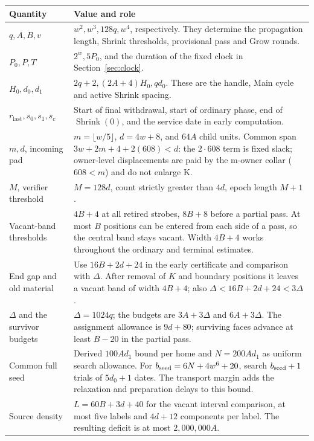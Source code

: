 \begin{longtable}{@{}>{\raggedright\arraybackslash}p{.30\linewidth}>{\raggedright\arraybackslash}p{.62\linewidth}@{}}
\toprule
Quantity & Value and role \\
\midrule
\endhead
\(q,A,B,v\) & \(w^2,w^3,128q,w^4\), respectively. They determine the propagation length, Shrink thresholds, provisional pass and Grow rounds. \\
\(P_0,P,T\) & \(2^w,5P_0\), and the duration of the fixed clock in Section~\ref{sec:clock}. \\
\(H_0,d_0,d_1\) & \(2q+2,(2A+4)H_0,qd_0\). These are the handle, Main cycle and active Shrink spacing. \\
\(r_{\mathrm{last}},s_0,s_1,s_c\) & Start of final withdrawal, start of ordinary phase, end of \(\operatorname{Shrink}(0)\), and the service date in early computation. \\
\(m,d\), incoming pad & \(m=\lfloor w/5\rfloor\), \(d=4w+8\), and \(64A\) child units. Common span \(3w+2m+4+2(608)<d\): the \(2\cdot608\) term is fixed slack; owner-level displacements are paid by the m-owner collar (\(608<m\)) and do not enlarge K. \\
\(M\), verifier threshold & \(M=128d\), count strictly greater than \(4d\), epoch length \(M+1\). \\
Vacant-band thresholds & \(4B+4\) at all retired strobes, \(8B+8\) before a partial pass. At most \(B\) positions can be entered from each side of a pass, so the central band stays vacant. Width \(4B+4\) works throughout the ordinary and terminal estimates. \\
End gap and old material & Use \(16B+2d+24\) in the early certificate and comparison with \(\Delta\). After removal of \(K\) and boundary positions it leaves a vacant band of width \(4B+4\); also \(\Delta<16B+2d+24<3\Delta\). \\
\(\Delta\) and the survivor budgets & \(\Delta=1024q\); the budgets are \(3A+3\Delta\) and \(6A+3\Delta\). The assignment allowance is \(9d+80\); surviving faces advance at least \(B-20\) in the partial pass. \\
Common full seed & Derived \(100A d_1\) bound per home and \(N=200A d_1\) as uniform search allowance. For \(b_{\rm seed}=6N+4w^6+20\), search \(b_{\rm seed}+1\) trials of \(5d_0+1\) dates. The transport margin adds the relaxation and preparation delays to this bound. \\
Source density & \(L=60B+3d+40\) for the vacant interval comparison, at most five labels and \(4d+12\) components per label. The resulting deficit is at most \(2{,}000{,}000A\). \\

\end{longtable}
